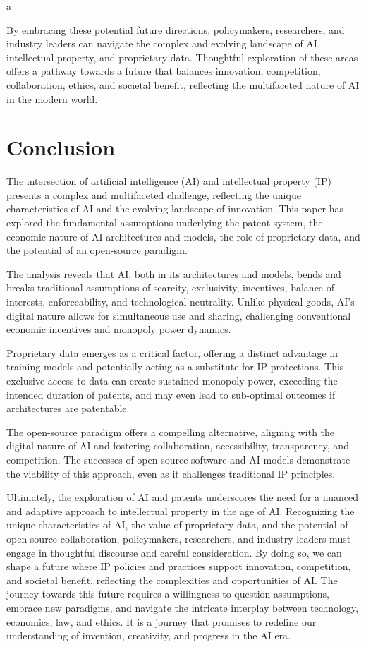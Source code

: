 a\documentclass{article}[10pt]
\begin{document}
By embracing these potential future directions, policymakers, researchers, and industry leaders can navigate the complex and evolving landscape of AI, intellectual property, and proprietary data. Thoughtful exploration of these areas offers a pathway towards a future that balances innovation, competition, collaboration, ethics, and societal benefit, reflecting the multifaceted nature of AI in the modern world.

\section{Conclusion}

The intersection of artificial intelligence (AI) and intellectual property (IP) presents a complex and multifaceted challenge, reflecting the unique characteristics of AI and the evolving landscape of innovation. This paper has explored the fundamental assumptions underlying the patent system, the economic nature of AI architectures and models, the role of proprietary data, and the potential of an open-source paradigm.

The analysis reveals that AI, both in its architectures and models, bends and breaks traditional assumptions of scarcity, exclusivity, incentives, balance of interests, enforceability, and technological neutrality. Unlike physical goods, AI's digital nature allows for simultaneous use and sharing, challenging conventional economic incentives and monopoly power dynamics.

Proprietary data emerges as a critical factor, offering a distinct advantage in training models and potentially acting as a substitute for IP protections. This exclusive access to data can create sustained monopoly power, exceeding the intended duration of patents, and may even lead to sub-optimal outcomes if architectures are patentable.

The open-source paradigm offers a compelling alternative, aligning with the digital nature of AI and fostering collaboration, accessibility, transparency, and competition. The successes of open-source software and AI models demonstrate the viability of this approach, even as it challenges traditional IP principles.

Ultimately, the exploration of AI and patents underscores the need for a nuanced and adaptive approach to intellectual property in the age of AI. Recognizing the unique characteristics of AI, the value of proprietary data, and the potential of open-source collaboration, policymakers, researchers, and industry leaders must engage in thoughtful discourse and careful consideration. By doing so, we can shape a future where IP policies and practices support innovation, competition, and societal benefit, reflecting the complexities and opportunities of AI. The journey towards this future requires a willingness to question assumptions, embrace new paradigms, and navigate the intricate interplay between technology, economics, law, and ethics. It is a journey that promises to redefine our understanding of invention, creativity, and progress in the AI era.

\newpage
% 
\printbibliography
\end{document}
